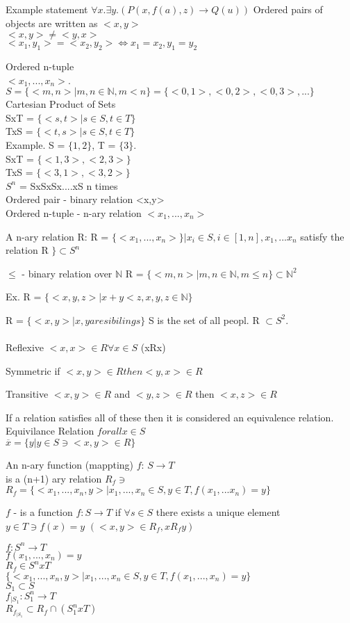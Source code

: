 \documentclass[12pt,oneside,notitlepage]{book}
\theoremstyle{definition}
\newcommand{\N}{\mb{N}}
\newcommand{\mb}[1]{\ensuremath{\mathbb{#1}}}
\begin{document}
Example statement
$\forall x. \exists y. (P(x, f(a), z) \to Q(u))$
Ordered pairs of objects are written as $<x,y>$ \\
$<x, y> \not = <y, x>$ \\
$<x_1, y_1> = <x_2, y_2> \iff x_1 = x_2, y_1 = y_2$

Ordered n-tuple \\
$<x_1, ..., x_n>$.  \\
$S= \{ <m,n> | m,n \in \N, m < n \} = \{ <0,1>,<0,2>,<0,3>,...\}$ \\
Cartesian Product of Sets \\
SxT = $\{<s,t> | s \in S, t \in T \}$ \\
TxS = $\{<t,s> | s \in S, t \in T \}$ \\
Example. S = $\{1,2\}$, T = $\{3\}$. \\
SxT = $\{<1,3>,<2,3>\}$ \\
TxS = $\{<3,1>, <3,2> \}$ \\

$S^n$ = SxSxSx....xS n times \\
Ordered pair - binary relation <x,y> \\
Ordered n-tuple - n-ary relation $<x_1,...,x_n>$

A n-ary relation R: R = $\{<x_1,...,x_n>\} | x_i \in S, i\in[1,n], x_1,...x_n $ satisfy the relation R $\} \subset S^n$

$\leq $ - binary relation over \N
R = $\{<m,n> | m,n \in \N, m \leq n \} \subset \N^2$

Ex.
R = $\{ <x,y,z> | x+y < z, x,y,z\in \N \}$

R = $\{ <x,y> | x,y are sibilings\}$
S is the set of all peopl.
R $\subset S^2$. \\ \\

Reflexive
$<x,x> \in R \forall x \in S$
(xRx)

Symmetric
if $<x,y> \in R then <y,x> \in R$

Transitive
$<x,y>\in R$ and $<y,z> \in R$ then $<x, z> \in R$

If a relation satisfies all of these then it is considered an equivalence relation.
Equivilance Relation
$forall x \in S$ \\
$\overline{x} = \{ y | y \in S \ni < x , y > \in R \}$

An n-ary function (mappting) $f$: $S \to T$ \\
is a (n+1) ary relation $R_f \ni$ \\
$R_f = \{ <x_1, ...,x_n, y> | x_1, ..., x_n \in S, y \in T, f(x_1,...x_n) = y \}$

$f$ - is a function $f:S \to T$ if $\forall s \in S$ there exists a unique element $y \in T \ni f(x)=y$ $(<x,y> \in R_f, xR_fy)$

$f:S^n \to T$ \\
$f(x_1,...,x_n)=y$ \\
$R_f \in S^n x T$ \\
$\{<x_1,...,x_n, y> | x_1,...,x_n \in S, y \in T, f(x_1,...,x_n) = y \}$ \\

$S_1 \subset S$ \\
$f_{|S_1} : S_1^n \to T$ \\
$R_{f_{|S_1}} \subset R_f \cap (S_1^n x T)$
\end{document}
